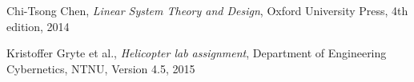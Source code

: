 
\begin{thebibliography}{9}
  Chi-Tsong Chen,
  \emph{Linear System Theory and Design},
  Oxford University Press,
  4th edition,
  2014

  Kristoffer Gryte et al.,
  \emph{Helicopter lab assignment},
  Department of Engineering Cybernetics,
  NTNU,
  Version 4.5,
  2015
\end{thebibliography}
